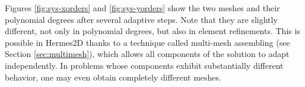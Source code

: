 Figures \ref{fig:sys-xorders} and \ref{fig:sys-yorders} show the two meshes and their polynomial
degrees after several adaptive steps. Note that they are slightly different, not only in
polynomial degrees, but also in element refinements. This is possible in Hermes2D thanks to
a technique called multi-mesh assembling (see Section \ref{sec:multimesh}), which allows
all components of the solution to adapt independently. In problems whose components exhibit
substantially different behavior, one may even obtain completely different meshes.

\clearpage







\newpage
